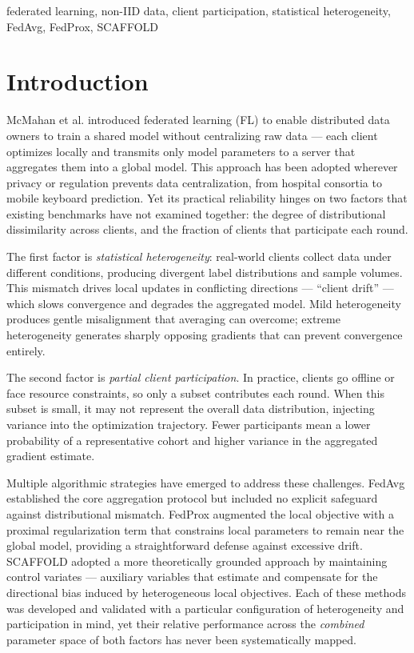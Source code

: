 \documentclass[conference]{IEEEtran}
\begin{document}
\begin{IEEEkeywords}
federated learning, non-IID data, client participation, statistical heterogeneity, FedAvg, FedProx, SCAFFOLD
\end{IEEEkeywords}

\section{Introduction}

McMahan et al. \cite{mcmahan2017fedavg} introduced federated learning (FL) to enable distributed data owners to train a shared model without centralizing raw data --- each client optimizes locally and transmits only model parameters to a server that aggregates them into a global model. This approach has been adopted wherever privacy or regulation prevents data centralization, from hospital consortia \cite{kairouz2021advances} to mobile keyboard prediction. Yet its practical reliability hinges on two factors that existing benchmarks have not examined together: the degree of distributional dissimilarity across clients, and the fraction of clients that participate each round.

The first factor is \textit{statistical heterogeneity}: real-world clients collect data under different conditions, producing divergent label distributions and sample volumes. This mismatch drives local updates in conflicting directions --- ``client drift'' \cite{karimireddy2020scaffold} --- which slows convergence and degrades the aggregated model. Mild heterogeneity produces gentle misalignment that averaging can overcome; extreme heterogeneity generates sharply opposing gradients that can prevent convergence entirely.

The second factor is \textit{partial client participation}. In practice, clients go offline or face resource constraints, so only a subset contributes each round. When this subset is small, it may not represent the overall data distribution, injecting variance into the optimization trajectory. Fewer participants mean a lower probability of a representative cohort and higher variance in the aggregated gradient estimate.

Multiple algorithmic strategies have emerged to address these challenges. FedAvg \cite{mcmahan2017fedavg} established the core aggregation protocol but included no explicit safeguard against distributional mismatch. FedProx \cite{li2020fedprox} augmented the local objective with a proximal regularization term that constrains local parameters to remain near the global model, providing a straightforward defense against excessive drift. SCAFFOLD \cite{karimireddy2020scaffold} adopted a more theoretically grounded approach by maintaining control variates --- auxiliary variables that estimate and compensate for the directional bias induced by heterogeneous local objectives. Each of these methods was developed and validated with a particular configuration of heterogeneity and participation in mind, yet their relative performance across the \textit{combined} parameter space of both factors has never been systematically mapped.
\end{document}
